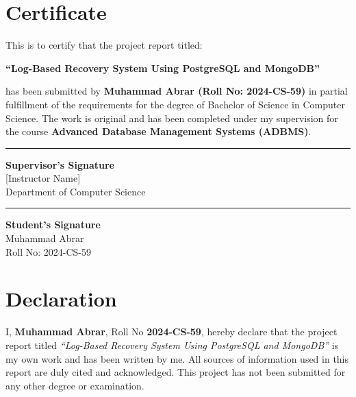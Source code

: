 \documentclass[12pt, a4paper]{report}
\begin{document}
\chapter*{Certificate}
\thispagestyle{plain}

\vspace{1cm}
This is to certify that the project report titled:

\vspace{0.5cm}
\begin{center}
{\large \bfseries ``Log-Based Recovery System Using PostgreSQL and MongoDB''}
\end{center}
\vspace{0.5cm}

has been submitted by \textbf{Muhammad Abrar (Roll No: 2024-CS-59)} in partial
fulfillment of the requirements for the degree of Bachelor of Science in
Computer Science. The work is original and has been completed under my
supervision for the course \textbf{Advanced Database Management Systems (ADBMS)}.

\vspace{3cm}
\begin{minipage}{0.45\textwidth}
  \hrule\vspace{0.3cm}
  \textbf{Supervisor's Signature}\\[0.2cm]
  [Instructor Name]\\
  Department of Computer Science
\end{minipage}
\hfill
\begin{minipage}{0.45\textwidth}
  \hrule\vspace{0.3cm}
  \textbf{Student's Signature}\\[0.2cm]
  Muhammad Abrar\\
  Roll No: 2024-CS-59
\end{minipage}

\chapter*{Declaration}
\thispagestyle{plain}

I, \textbf{Muhammad Abrar}, Roll No \textbf{2024-CS-59}, hereby declare that
the project report titled \textit{``Log-Based Recovery System Using PostgreSQL
and MongoDB''} is my own work and has been written by me. All sources of
information used in this report are duly cited and acknowledged. This project
has not been submitted for any other degree or examination.
\end{document}
